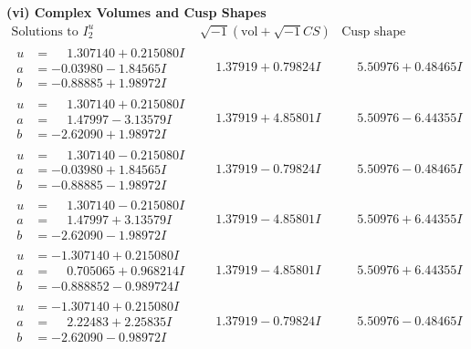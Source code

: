 \documentclass[1p]{elsarticle_modified}
\theoremstyle{definition}
\newcommand{\I}{\sqrt{-1}}
\begin{document}
\newpage\flushleft \textbf{(vi) Complex Volumes and Cusp Shapes}
$$\begin{array}{c|c|c}  
\text{Solutions to }I^u_{2}& \I (\text{vol} + \sqrt{-1}CS) & \text{Cusp shape}\\
 \hline 
\begin{aligned}
u &= \phantom{-}1.307140 + 0.215080 I \\
a &= -0.03980 - 1.84565 I \\
b &= -0.88885 + 1.98972 I\end{aligned}
 & \phantom{-}1.37919 + 0.79824 I & \phantom{-}5.50976 + 0.48465 I \\ \hline\begin{aligned}
u &= \phantom{-}1.307140 + 0.215080 I \\
a &= \phantom{-}1.47997 - 3.13579 I \\
b &= -2.62090 + 1.98972 I\end{aligned}
 & \phantom{-}1.37919 + 4.85801 I & \phantom{-}5.50976 - 6.44355 I \\ \hline\begin{aligned}
u &= \phantom{-}1.307140 - 0.215080 I \\
a &= -0.03980 + 1.84565 I \\
b &= -0.88885 - 1.98972 I\end{aligned}
 & \phantom{-}1.37919 - 0.79824 I & \phantom{-}5.50976 - 0.48465 I \\ \hline\begin{aligned}
u &= \phantom{-}1.307140 - 0.215080 I \\
a &= \phantom{-}1.47997 + 3.13579 I \\
b &= -2.62090 - 1.98972 I\end{aligned}
 & \phantom{-}1.37919 - 4.85801 I & \phantom{-}5.50976 + 6.44355 I \\ \hline\begin{aligned}
u &= -1.307140 + 0.215080 I \\
a &= \phantom{-}0.705065 + 0.968214 I \\
b &= -0.888852 - 0.989724 I\end{aligned}
 & \phantom{-}1.37919 - 4.85801 I & \phantom{-}5.50976 + 6.44355 I \\ \hline\begin{aligned}
u &= -1.307140 + 0.215080 I \\
a &= \phantom{-}2.22483 + 2.25835 I \\
b &= -2.62090 - 0.98972 I\end{aligned}
 & \phantom{-}1.37919 - 0.79824 I & \phantom{-}5.50976 - 0.48465 I \\ \hline\begin{aligned}

\end{aligned}
\end{array}$$
\end{document}
